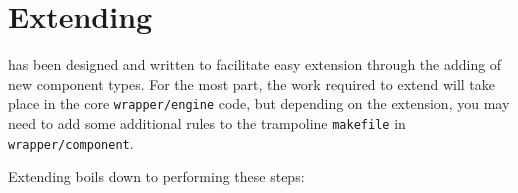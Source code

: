 %
%
%
%
\chapter{Extending \lmsbw}\label{chap:extending}

\lmsbw has been designed and written to facilitate easy extension
through the adding of new component types.  For the most part, the
work required to extend will take place in the core
\texttt{wrapper/engine} code, but depending on the extension, you may
need to add some additional rules to the trampoline \texttt{makefile}
in \texttt{wrapper/component}.

Extending boils down to performing these steps:

